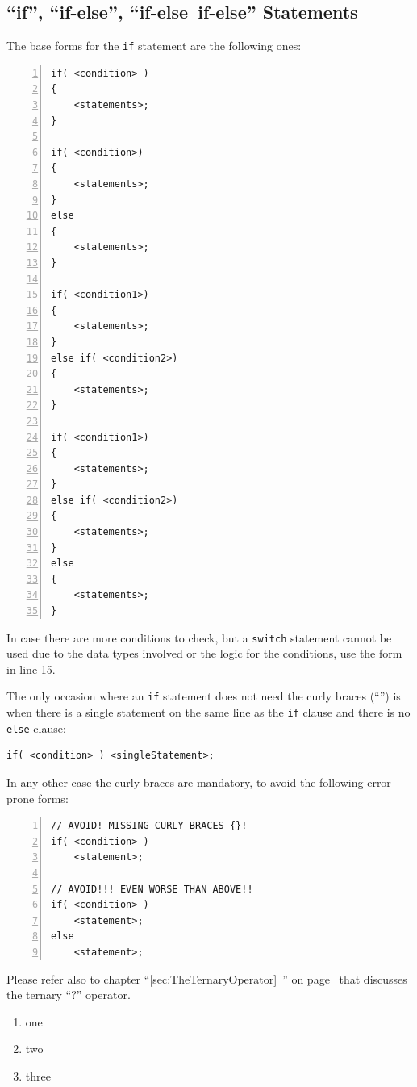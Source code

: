 \documentclass[11pt,a4paper, titlepage, parskip=half, headsepline, footsepline, cleardoublepage=current, headheight=1cm]{scrbook}
\newcommand*{\tqfullvref}[1]{\hyperref[{#1}]{“\ref*{#1}~\nameref*{#1}”} on page~\pageref{#1}}
\begin{document}
\subsection{“if”, “if-else”, “if-else~if-else” Statements}\label{sec:IfStatements}

The base forms for the \lstinline|if| statement are the following ones:
\begin{lstlisting}[numbers=left]
if( <condition> )
{
    <statements>;
}

if( <condition>)
{
    <statements>;
}
else
{
    <statements>;
}

if( <condition1>)
{
    <statements>;
}
else if( <condition2>)
{
    <statements>;
}

if( <condition1>)
{
    <statements>;
}
else if( <condition2>)
{
    <statements>;
}
else
{
    <statements>;
}
\end{lstlisting}

In case there are more conditions to check, but a \lstinline|switch| statement cannot be used due to the data types involved or the logic for the conditions, use the form in line 15.

The only occasion where an \lstinline|if| statement does not need the curly braces (“{}”) is when there is a single statement on the same line as the \lstinline|if| clause and there is no \lstinline|else| clause:

\begin{lstlisting}
if( <condition> ) <singleStatement>;
\end{lstlisting}

In any other case the curly braces are mandatory, to avoid the following error-prone forms:

\begin{lstlisting}[numbers=left]
// AVOID! MISSING CURLY BRACES {}!
if( <condition> )
    <statement>;

// AVOID!!! EVEN WORSE THAN ABOVE!!    
if( <condition> )
    <statement>;
else
    <statement>;
\end{lstlisting}

Please refer also to chapter \tqfullvref{sec:TheTernaryOperator} that discusses the ternary “?” operator.


\hrulefill\newpage 

\begin{enumerate}[label=P\arabic*.]
\item one
\item two
\item three
\end{enumerate}
\end{document}
